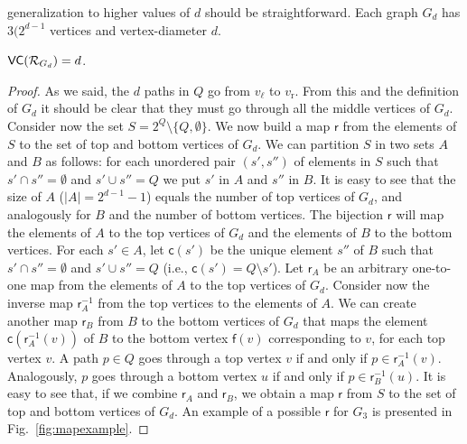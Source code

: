 generalization to higher values of $d$ should be straightforward. Each graph
$G_d$ has $3(2^{d-1}$ vertices and vertex-diameter $d$.
\fi
\begin{lemma}\label{lem:vcdimlowbound}
  $\mathsf{VC}(\mathcal{R}_{G_d})=d$.
\end{lemma}
\ifproof
\begin{proof}
  As we said, the $d$ paths in $Q$  go from $v_\ell$ to $v_\mathrm{r}$.
  From this and the definition of $G_d$ it should be clear that they must go through
  all the middle vertices of $G_d$. Consider now the set
  $S=2^Q\setminus\{Q,\emptyset\}$. We now build a map $\mathsf{r}$
  from the elements of $S$ to the set of top and bottom vertices of $G_d$. We can
  partition $S$ in two sets $A$ and $B$ as follows: %
  for each unordered pair $(s',s'')$ of
  elements in $S$ such that $s'\cap s''=\emptyset$ and $s'\cup s''=Q$
  we put $s'$ in $A$ and $s''$ in $B$. It is
  easy to see that the size of $A$ ($|A|=2^{d-1}-1$) equals the number of top
  vertices of $G_d$, and analogously for $B$ and the number of bottom vertices.
  The bijection $\mathsf{r}$ will map the
  elements of $A$ to the top vertices of $G_d$ and the elements of $B$ to the
  bottom vertices. For each $s'\in A$, let $\mathsf{c}(s')$ be the unique element $s''$
  of $B$ such that $s'\cap s''=\emptyset$ and $s'\cup s''=Q$ (i.e.,
  $\mathsf{c}(s')=Q\setminus s'$). 
  Let $\mathsf{r}_A$ be an arbitrary one-to-one map from the elements of $A$ to
  the top vertices of $G_d$. Consider now the inverse map $\mathsf{r}^{-1}_A$
  from the top vertices to the elements of $A$. We can create another map
  $\mathsf{r}_B$ from $B$ to the
  bottom vertices of $G_d$ that maps the element
  $\mathsf{c}(\mathsf{r}^{-1}_A(v))$ of $B$ to the bottom vertex $\mathsf{f}(v)$
  corresponding to $v$, for each top vertex $v$. A path $p\in Q$ goes through
  a top vertex $v$ if and only if $p\in\mathsf{r}^{-1}_A(v)$. Analogously, $p$
  goes through a bottom vertex $u$ if and only if $p\in\mathsf{r}^{-1}_B(u)$.
  It is easy to see that, if we combine $\mathsf{r}_A$ and
  $\mathsf{r}_B$, we obtain a map $\mathsf{r}$ from $S$ to the set of
  top and bottom vertices of $G_d$. An example of a possible $\mathsf{r}$ for
  $G_3$ is presented in Fig.~\ref{fig:mapexample}.


\end{proof}
